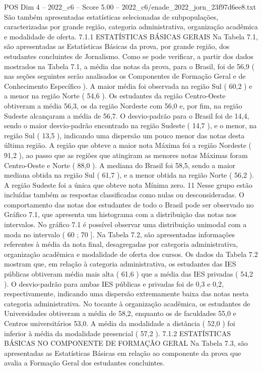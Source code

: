 \begin{textsample}{POS Dim 4 – 2022\_c6 – Score 5.00 – 2022\_c6/enade\_2022\_jorn\_23f97d6ee8.txt}
São também apresentadas estatísticas selecionadas de subpopulações, caracterizadas por grande região, categoria administrativa, organização acadêmica e modalidade de oferta. 7.1.1 ESTATÍSTICAS BÁSICAS GERAIS Na Tabela 7.1, são apresentadas as Estatísticas Básicas da prova, por grande região, dos estudantes concluintes de Jornalismo.
Como se pode verificar, a partir dos dados mostrados na Tabela 7.1, a média das notas da prova, para o Brasil, foi de 56,9 ( nas seções seguintes serão analisados os Componentes de Formação Geral e de Conhecimento Específico ).
A maior média foi observada na região Sul ( 60,2 ) e a menor na região Norte ( 54,6 ).
Os estudantes da região Centro-Oeste obtiveram a média 56,3, os da região Nordeste com 56,0 e, por fim, na região Sudeste alcançaram a média de 56,7.
O desvio-padrão para o Brasil foi de 14,4, sendo o maior desvio-padrão encontrado na região Sudeste ( 14,7 ), e o menor, na região Sul ( 13,5 ), indicando uma dispersão um pouco menor das notas desta última região.
A região que obteve a maior nota Máxima foi a região Nordeste ( 91,2 ), ao passo que as regiões que atingiram as menores notas Máximas foram Centro-Oeste e Norte ( 88,0 ).
A mediana do Brasil foi 58,5, sendo a maior mediana obtida na região Sul ( 61,7 ), e a menor obtida na região Norte ( 56,2 ).
A região Sudeste foi a única que obteve nota Mínima zero. 11 Nesse grupo estão incluídas também as respostas classificadas como nulas ou desconsideradas.
O comportamento das notas dos estudantes de todo o Brasil pode ser observado no Gráfico 7.1, que apresenta um histograma com a distribuição das notas nos intervalos.
No gráfico 7.1 é possível observar uma distribuição unimodal com a moda no intervalo ( 60 ; 70 ].
Na Tabela 7.2, são apresentadas informações referentes à média da nota final, desagregadas por categoria administrativa, organização acadêmica e modalidade de oferta dos cursos.
Os dados da Tabela 7.2 mostram que, em relação à categoria administrativa, os estudantes das IES públicas obtiveram média mais alta ( 61,6 ) que a média das IES privadas ( 54,2 ).
O desvio-padrão para ambas IES públicas e privadas foi de 0,3 e 0,2, respectivamente, indicando uma dispersão extremamente baixa das notas nesta categoria administrativa.
No tocante à organização acadêmica, os estudantes de Universidades obtiveram a média de 58,2, enquanto os de faculdades 55,0 e Centros universitários 53,0.
A média da modalidade a distância ( 52,0 ) foi inferior à média da modalidade presencial ( 57,2 ). 7.1.2 ESTATÍSTICAS BÁSICAS NO COMPONENTE DE FORMAÇÃO GERAL Na Tabela 7.3, são apresentadas as Estatísticas Básicas em relação ao componente da prova que avalia a Formação Geral dos estudantes concluintes.

\end{textsample}
